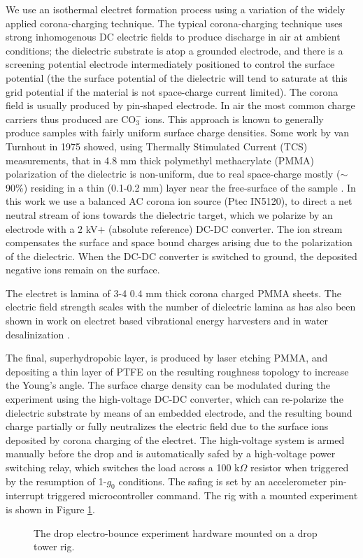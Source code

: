 \documentclass[12pt,a4paper,oneside]{book}
\begin{document}
We use an isothermal electret formation process using a variation of the widely applied corona-charging technique. The typical corona-charging technique uses strong inhomogenous DC electric fields to produce discharge in air at ambient conditions; the dielectric substrate is atop a grounded electrode, and there is a screening potential electrode intermediately positioned to control the surface potential (the the surface potential of the dielectric will tend to saturate at this grid potential if the material is not space-charge current limited). The corona field is usually produced by pin-shaped electrode. In air the most common charge carriers thus produced are $\mbox{CO}_3^-$ ions. This approach is known to generally produce samples with fairly uniform surface charge densities. Some work by van Turnhout in 1975 showed, using Thermally Stimulated Current (TCS) measurements, that in 4.8 mm thick polymethyl methacrylate (PMMA) polarization of the dielectric is non-uniform, due to real space-charge mostly ($\sim$90\%) residing in a thin (0.1-0.2 mm) layer near the free-surface of the sample \cite{van_turnhout_thermally_1975}. In this work we use a balanced AC corona ion source (Ptec IN5120), to direct a net neutral stream of ions towards the dielectric target, which we polarize by an electrode with a $2$ kV$+$ (absolute reference) DC-DC converter. The ion stream compensates the surface and space bound charges arising due to the polarization of the dielectric. When the DC-DC converter is switched to ground, the deposited negative ions remain on the surface. 

The electret is lamina of 3-4 0.4 mm thick corona charged PMMA sheets. The electric field strength scales with the number of dielectric lamina as has also been shown in work on electret based vibrational energy harvesters \cite{wada_stacking_2012} and in water desalinization \cite{ni_desalination_2005}. 

The final, superhydropobic layer, is produced by laser etching PMMA, and depositing a thin layer of PTFE on the resulting roughness topology to increase the Young's angle. The surface charge density can be modulated during the experiment using the high-voltage DC-DC converter, which can re-polarize the dielectric substrate by means of an embedded electrode, and the resulting bound charge partially or fully neutralizes the electric field due to the surface ions deposited by corona charging of the electret. The high-voltage system is armed manually before the drop and is automatically safed by a high-voltage power switching relay, which switches the load across a 100 k$\Omega$ resistor when triggered by the resumption of 1-$g_0$ conditions. The safing is set by an accelerometer pin-interrupt triggered microcontroller command. The rig with a mounted experiment is shown in Figure \ref{fig:rig}. 
\begin{figure}
    \centering
    \def\svgwidth{\columnwidth}
    
    \caption{The drop electro-bounce experiment hardware mounted on a drop tower rig.\label{fig:rig}}
\end{figure}
\end{document}
